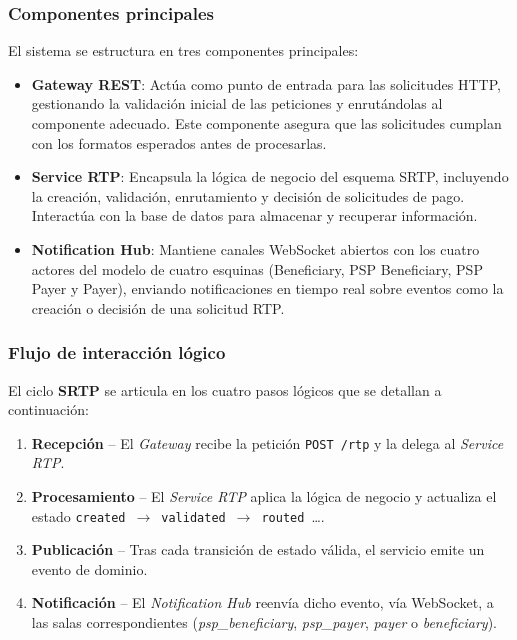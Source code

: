 \subsubsection{Componentes principales}
\label{subsec:componentes_principales}
El sistema se estructura en tres componentes principales:
\begin{itemize}
  \item \textbf{Gateway REST}: Actúa como punto de entrada para las solicitudes HTTP, gestionando la validación inicial de las peticiones y enrutándolas al componente adecuado. Este componente asegura que las solicitudes cumplan con los formatos esperados antes de procesarlas.
  \item \textbf{Service RTP}: Encapsula la lógica de negocio del esquema SRTP, incluyendo la creación, validación, enrutamiento y decisión de solicitudes de pago. Interactúa con la base de datos para almacenar y recuperar información.
  \item \textbf{Notification Hub}: Mantiene canales WebSocket abiertos con los cuatro actores del modelo de cuatro esquinas (Beneficiary, PSP Beneficiary, PSP Payer y Payer), enviando notificaciones en tiempo real sobre eventos como la creación o decisión de una solicitud RTP.
\end{itemize}

\subsubsection{Flujo de interacción lógico}
\label{subsec:flujo_interaccion}

El ciclo \textbf{SRTP} se articula en los cuatro pasos lógicos que se detallan a continuación:

\begin{enumerate}[label=\arabic*.]
  \item \textbf{Recepción} – El \emph{Gateway} recibe la petición
        \verb|POST /rtp| y la delega al \emph{Service RTP}.
  \item \textbf{Procesamiento} – El \emph{Service RTP} aplica la lógica de negocio
        y actualiza el estado
        \mbox{\texttt{created} $\rightarrow$ \texttt{validated} $\rightarrow$ \texttt{routed} …}.
  \item \textbf{Publicación} – Tras cada transición de estado válida,
        el servicio emite un evento de dominio.
  \item \textbf{Notificación} – El \emph{Notification Hub} reenvía dicho evento,
        vía WebSocket, a las salas correspondientes
        (\emph{psp\_beneficiary}, \emph{psp\_payer}, \emph{payer} o \emph{beneficiary}).
\end{enumerate}

